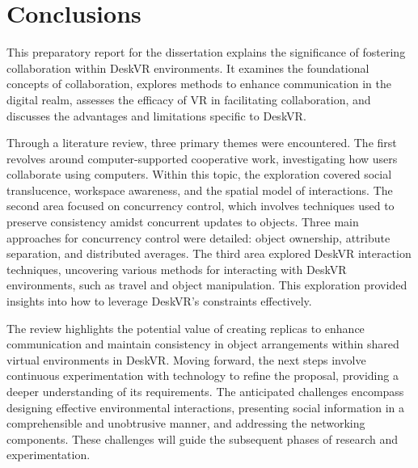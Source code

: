 \chapter{Conclusions} \label{chap:concl}

This preparatory report for the dissertation explains the significance of fostering collaboration within DeskVR environments. It examines the foundational concepts of collaboration, explores methods to enhance communication in the digital realm, assesses the efficacy of VR in facilitating collaboration, and discusses the advantages and limitations specific to DeskVR.

Through a literature review, three primary themes were encountered. The first revolves around computer-supported cooperative work, investigating how users collaborate using computers. Within this topic, the exploration covered social translucence, workspace awareness, and the spatial model of interactions. The second area focused on concurrency control, which involves techniques used to preserve consistency amidst concurrent updates to objects. Three main approaches for concurrency control were detailed: object ownership, attribute separation, and distributed averages. The third area explored DeskVR interaction techniques, uncovering various methods for interacting with DeskVR environments, such as travel and object manipulation. This exploration provided insights into how to leverage DeskVR's constraints effectively.

The review highlights the potential value of creating replicas to enhance communication and maintain consistency in object arrangements within shared virtual environments in DeskVR. Moving forward, the next steps involve continuous experimentation with technology to refine the proposal, providing a deeper understanding of its requirements. The anticipated challenges encompass designing effective environmental interactions, presenting social information in a comprehensible and unobtrusive manner, and addressing the networking components. These challenges will guide the subsequent phases of research and experimentation.

